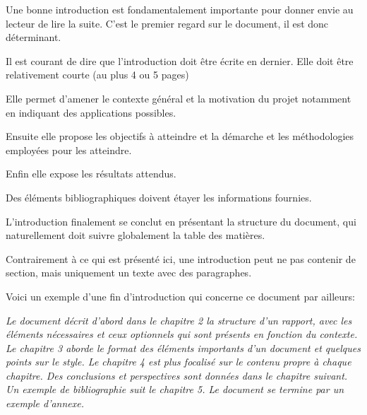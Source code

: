 
Une bonne introduction est fondamentalement importante pour donner envie au lecteur de lire la suite. C'est le premier regard sur le document, il est 
donc déterminant. 

Il est courant de dire que l'introduction doit être écrite en dernier. Elle doit être relativement courte (au plus 4 ou 5 pages)

Elle  permet d'amener le contexte général et la motivation du projet
notamment en indiquant des applications possibles.

Ensuite elle propose les  objectifs à atteindre 
et  la démarche et les méthodologies employées pour les atteindre.

Enfin  elle expose les résultats attendus.

Des éléments bibliographiques doivent étayer les informations fournies.

L'introduction finalement se conclut en présentant la structure
du document, qui naturellement doit suivre globalement la table des matières. 

Contrairement à ce qui est présenté ici, une introduction peut ne pas contenir de section, mais uniquement un texte avec des paragraphes.

Voici un exemple d'une fin d'introduction qui concerne ce document par ailleurs:


\textit{Le document décrit d'abord dans le chapitre 2 la structure d'un rapport, avec 
les éléments nécessaires et ceux optionnels qui sont présents en fonction du contexte. 
Le chapitre 3 aborde le format des éléments importants d'un document et 
quelques points sur le style. 
Le chapitre 4 est plus focalisé sur le contenu propre à chaque chapitre. 
Des conclusions et perspectives sont données dans le chapitre suivant. Un exemple de bibliographie suit le chapitre 5. 
Le document se termine par un exemple d'annexe.
}